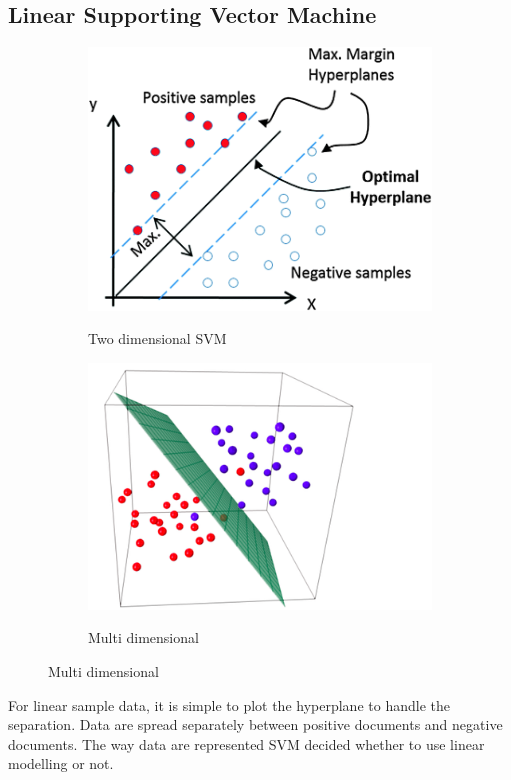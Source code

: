 \subsection{Linear Supporting Vector Machine }
\newpage
\begin{figure}
        \begin{subfigure}{.6\textwidth}
         \includegraphics[scale=.3]    	          {images/linear.png} \label{linear}
         \caption{Two dimensional SVM}
        \end{subfigure}%
        \begin{subfigure}{\textwidth}
                \includegraphics[scale=.6]    	                 {images/multi.png}
                \label{multi}
                \caption{Multi dimensional  }
        \end{subfigure}

\end{figure}
For linear sample data, it is simple to plot the hyperplane to handle the separation.  Data are spread separately between positive documents and negative documents. The way data are represented SVM decided  whether to use linear modelling or not. 

